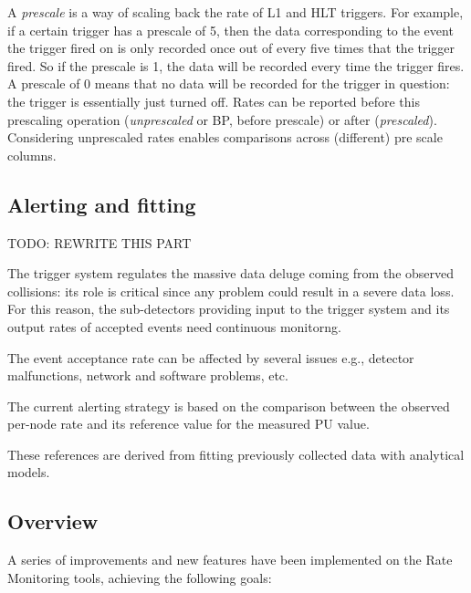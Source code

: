 A \textit{prescale} is a way of scaling back the rate of L1 and HLT triggers. For example, if a certain trigger has a prescale of 5, then the data corresponding to the event the trigger fired on is only recorded once out of every five times that the trigger fired. So if the prescale is 1, the data will be recorded every time the trigger fires. A prescale of 0 means that no data will be recorded for the trigger in question: the trigger is essentially just turned off. Rates can be reported before this prescaling operation (\textit{unprescaled} or BP, before prescale) or after (\textit{prescaled}). Considering unprescaled rates enables comparisons across (different) pre scale columns.

\subsection{Alerting and fitting}

TODO: REWRITE THIS PART

The trigger system regulates the massive data deluge coming from the observed collisions: its role is critical since any problem could result in a severe data loss. For this reason, the sub-detectors providing input to the trigger system and its output rates of accepted events need continuous monitorng.

The event acceptance rate can be affected by several issues e.g., detector malfunctions, network and software problems, etc.

The current alerting strategy is based on the comparison between the observed per-node rate and its reference value for the measured PU value.

These references are derived from fitting previously collected data with analytical models.

\subsection{Overview}

A series of improvements and new features have been implemented on the Rate Monitoring tools, achieving the following goals:

